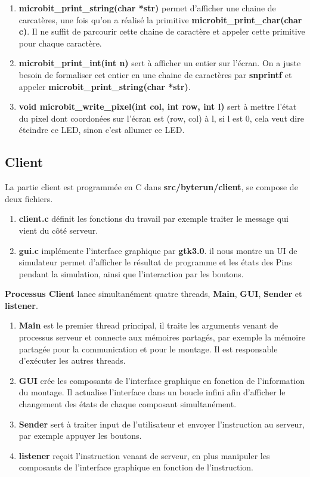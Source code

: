 \documentclass[14px]{article}
\begin{document}
\begin{enumerate}
	\item \textbf{microbit\_print\_string(char *str)} permet d'afficher une chaine de carcatères, une fois qu'on a réalisé la primitive \textbf{microbit\_print\_char(char c)}. Il ne suffit de parcourir cette chaine de caractère et appeler cette primitive pour chaque caractère.
	\item \textbf{microbit\_print\_int(int n)} sert à afficher un entier sur l'écran. On a juste besoin de formaliser cet entier en une chaine de caractères par \textbf{snprintf} et appeler \textbf{microbit\_print\_string(char *str)}.
	\item \textbf{void microbit\_write\_pixel(int col, int row, int l)} sert à mettre l'état du pixel dont coordonées sur l'écran est (row, col) à l, si l est 0, cela veut dire éteindre ce LED, sinon c'est allumer ce LED.

\end{enumerate}



\subsection{Client}
La partie client est programmée en C dans \textbf{src/byterun/client}, se compose de deux fichiers.
\begin{enumerate}
	\item \textbf{client.c} définit les fonctions du travail par exemple traiter le message qui vient du côté serveur.

	\item \textbf{gui.c} implémente l'interface graphique par \textbf{gtk3.0}.
	il nous montre un UI de simulateur permet d'afficher le résultat de programme et les états des Pins pendant la simulation, ainsi que l'interaction par les boutons.\\
\end{enumerate}

\textbf{Processus Client} lance simultanément quatre threads, \textbf{Main}, \textbf{GUI}, \textbf{Sender} et \textbf{listener}.
\begin{enumerate}
	\item \textbf{Main} est le premier thread principal, il traite les arguments venant de processus serveur et connecte aux mémoires partagés, par exemple la mémoire partagée pour la communication et pour le montage. Il est responsable d'exécuter les autres threads.
	\item \textbf{GUI} crée les composants de l'interface graphique en fonction de l'information du montage. Il actualise l'interface dans un boucle infini afin d'afficher le changement des états de chaque composant simultanément.
	\item \textbf{Sender} sert à traiter input de l'utilisateur et envoyer l'instruction au serveur, par exemple appuyer les boutons.
	\item \textbf{listener} reçoit l'instruction venant de serveur, en plus manipuler les composants de l'interface graphique en fonction de l'instruction.
\end{enumerate}
\end{document}
